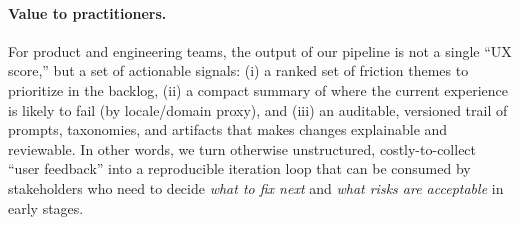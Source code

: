 \paragraph{Value to practitioners.}
For product and engineering teams, the output of our pipeline is not a single ``UX score,'' but a set of actionable signals:
(i) a ranked set of friction themes to prioritize in the backlog, (ii) a compact summary of where the current experience
is likely to fail (by locale/domain proxy), and (iii) an auditable, versioned trail of prompts, taxonomies, and artifacts
that makes changes explainable and reviewable.
In other words, we turn otherwise unstructured, costly-to-collect ``user feedback'' into a reproducible iteration loop
that can be consumed by stakeholders who need to decide \emph{what to fix next} and \emph{what risks are acceptable} in early stages.
